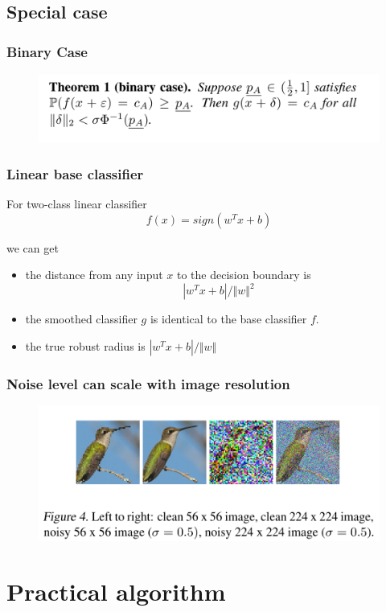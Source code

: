 \documentclass[aspectratio=169%
,serif,mathserif]{beamer}
\begin{document}
\subsection{Special case}
\begin{frame}
	\frametitle{Binary Case}
	\begin{figure}
		\includegraphics[width=0.8\linewidth]{7.png}
	\end{figure}
\end{frame}


\begin{frame}
	\frametitle{Linear base classifier}
	For two-class linear classifier
	$$
	f(x) = sign(w^Tx + b)
	$$

	we can get

	\begin{itemize}
		\item the distance from any input $x$ to the decision boundary is
		$$
		|w^Tx + b| / \Vert w \Vert ^2
		$$
		\item the smoothed classifier $g$ is identical to the base classifier $f$.
		\item  the true robust radius is $|w^Tx + b| / \Vert w \Vert$
	\end{itemize}
\end{frame}

\begin{frame}
	\frametitle{Noise level can scale with image resolution}
	\begin{figure}
		\includegraphics[width=0.8\linewidth]{8.png}
	\end{figure}
\end{frame}

\section{Practical algorithm}
\end{document}
